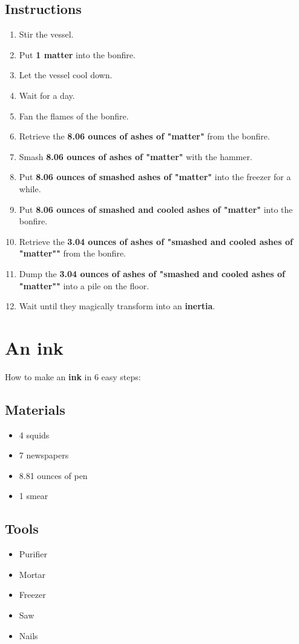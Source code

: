 \documentclass{article}
\begin{document}
\subsection{Instructions}\begin{enumerate}
\item 
Stir the vessel.
\item 
Put \textbf{1 matter} into the bonfire.
\item 
Let the vessel cool down.
\item 
Wait for a day.
\item 
Fan the flames of the bonfire.
\item 
Retrieve the \textbf{8.06 ounces of ashes of "matter"} from the bonfire.
\item 
Smash \textbf{8.06 ounces of ashes of "matter"} with the hammer.
\item 
Put \textbf{8.06 ounces of smashed ashes of "matter"} into the freezer for a while.
\item 
Put \textbf{8.06 ounces of smashed and cooled ashes of "matter"} into the bonfire.
\item 
Retrieve the \textbf{3.04 ounces of ashes of "smashed and cooled ashes of "matter""} from the bonfire.
\item 
Dump the \textbf{3.04 ounces of ashes of "smashed and cooled ashes of "matter""} into a pile on the floor.
\item 
Wait until they magically transform into an \textbf{inertia}.
\end{enumerate}
\newpage
\section{An ink}How to make an \textbf{ink} in 6 easy steps:

\subsection{Materials}\begin{itemize}
\item 
4 squids
\item 
7 newspapers
\item 
8.81 ounces of pen
\item 
1 smear
\end{itemize}
\subsection{Tools}\begin{itemize}
\item 
Purifier
\item 
Mortar
\item 
Freezer
\item 
Saw
\item 
Nails
\end{itemize}
\end{document}
